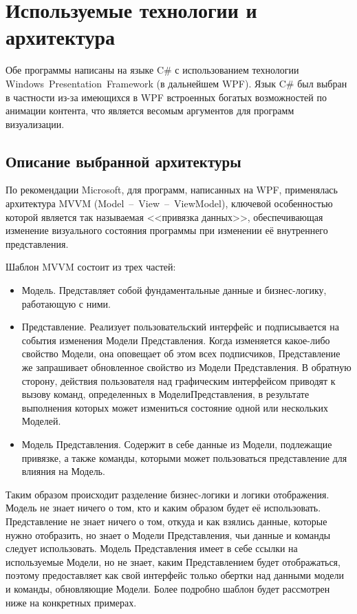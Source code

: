 \section{Используемые технологии и архитектура}
Обе программы написаны на языке C\# с использованием технологии Windows~Presentation~Framework (в дальнейшем WPF)\cite{wpf}.
Язык C\# был выбран в частности из-за имеющихся в WPF встроенных богатых возможностей по анимации контента, что является весомым аргументов для программ визуализации.

\subsection{Описание выбранной архитектуры}
По рекомендации Microsoft, для программ, написанных на WPF, применялась архитектура MVVM (Model~--~View~--~ViewModel)\cite{mvvm}, ключевой особенностью которой является так называемая <<привязка данных>>\cite{data_binding}, обеспечивающая изменение визуального состояния программы при изменении её внутреннего представления.

Шаблон MVVM состоит из трех частей:
\begin{itemize}
  \item Модель. Представляет собой фундаментальные данные и бизнес-логику, работающую с ними.
  \item Представление. Реализует пользовательский интерфейс и подписывается на события изменения Модели Представления. Когда изменяется какое-либо свойство Модели, она оповещает об этом всех подписчиков, Представление же запрашивает обновленное свойство из Модели Представления. В обратную сторону, действия пользователя над графическим интерфейсом приводят к вызову команд, определенных в МоделиПредставления, в результате выполнения которых может измениться состояние одной или нескольких Моделей.
  \item Модель Представления. Содержит в себе данные из Модели, подлежащие привязке, а также команды, которыми может пользоваться представление для влияния на Модель.
\end{itemize}

Таким образом происходит разделение бизнес-логики и логики отображения. Модель не знает ничего о том, кто и каким образом будет её использовать. Представление не знает ничего о том, откуда и как взялись данные, которые нужно отобразить, но знает о Модели Представления, чьи данные и команды следует использовать. Модель Представления имеет в себе ссылки на используемые Модели, но не знает, каким Представлением будет отображаться, поэтому предоставляет как свой интерфейс только обертки над данными модели и команды, обновляющие Модели. Более подробно шаблон будет рассмотрен ниже на конкретных примерах.

